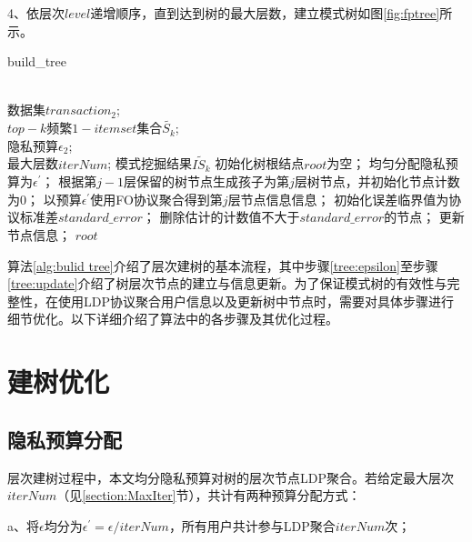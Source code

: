 \documentclass[UTF8]{ctexart}
\begin{document}
4、依层次$level$递增顺序，直到达到树的最大层数，建立模式树如图\ref{fig:fptree}所示。

\begin{algorithm}[ht]
\caption{build\_tree}
\label{alg:bulid tree}
\begin{algorithmic}[1]
\REQUIRE ~~\\
数据集$transaction_2$;\\
$top-k$频繁$1-itemset$集合$\tilde{S_k}$;\\
隐私预算$\epsilon_2$;\\
最大层数$iterNum$;
\ENSURE 模式挖掘结果$\tilde{IS_k}$
\STATE 初始化树根结点$root$为空；
    \STATE 均匀分配隐私预算为$\epsilon^{\prime}$；
    \label{tree:epsilon}
    \STATE 根据第$j-1$层保留的树节点生成孩子为第$j$层树节点，并初始化节点计数为0；
    \label{tree:child node}
    \STATE 以预算$\epsilon^{\prime}$使用FO协议聚合得到第$j$层节点信息信息；
    \label{tree:FO}
    \STATE 初始化误差临界值为协议标准差$standard\_error$；
    \label{tree:error bound}
    \STATE 删除估计的计数值不大于$standard\_error$的节点；
    \label{tree:filter}
    \STATE 更新节点信息；
    \label{tree:update}
\ENDFOR
\RETURN $root$
\end{algorithmic}
\end{algorithm}


算法\ref{alg:bulid tree}介绍了层次建树的基本流程，其中步骤\ref{tree:epsilon}至步骤\ref{tree:update}介绍了树层次节点的建立与信息更新。为了保证模式树的有效性与完整性，在使用LDP协议聚合用户信息以及更新树中节点时，需要对具体步骤进行细节优化。以下详细介绍了算法中的各步骤及其优化过程。

\section{建树优化}

\subsection{隐私预算分配}\label{section:Allocate privacy budget}
层次建树过程中，本文均分隐私预算对树的层次节点LDP聚合。若给定最大层次$iterNum$（见\ref{section:MaxIter}节），共计有两种预算分配方式：

a、将$\epsilon$均分为$\epsilon^{\prime} = \epsilon / iterNum$，所有用户共计参与LDP聚合$iterNum$次；
\end{document}
